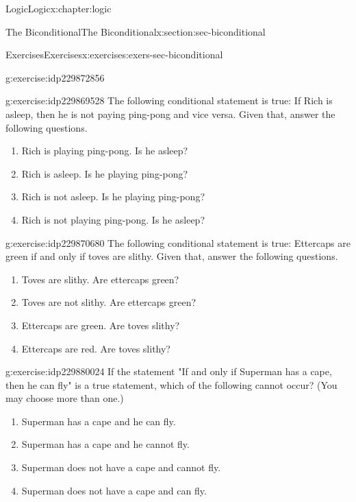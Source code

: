 \documentclass[twoside,10pt,]{book}
\numberwithin{equation}{section}
\begin{document}
\begin{chapterptx}{Logic}{}{Logic}{}{}{x:chapter:logic}
\begin{sectionptx}{The Biconditional}{}{The Biconditional}{}{}{x:section:sec-biconditional}
\begin{exercises-subsection}{Exercises}{}{Exercises}{}{}{x:exercises:exers-sec-biconditional}
\begin{divisionexercise}{33}{}{}{g:exercise:idp229872856}
\end{divisionexercise}%
\begin{divisionexercise}{34}{}{}{g:exercise:idp229869528}%
The following conditional statement is true: If Rich is asleep, then he is not paying ping-pong and vice versa.  Given that, answer the following questions. %
\begin{enumerate}[label=(\alph*)]
\item{}Rich is playing ping-pong.  Is he asleep?%
\item{}Rich is asleep.  Is he playing ping-pong?%
\item{}Rich is not asleep.  Is he playing ping-pong?%
\item{}Rich is not playing ping-pong.  Is he asleep?%
\end{enumerate}
\end{divisionexercise}%
\begin{divisionexercise}{35}{}{}{g:exercise:idp229870680}%
The following conditional statement is true: Ettercaps are green if and only if toves are slithy.  Given that, answer the following questions. %
\begin{enumerate}[label=(\alph*)]
\item{}Toves are slithy.  Are ettercaps green?%
\item{}Toves are not slithy.  Are ettercaps green?%
\item{}Ettercaps are green.  Are toves slithy?%
\item{}Ettercaps are red.  Are toves slithy?%
\end{enumerate}
\end{divisionexercise}%
\begin{divisionexercise}{36}{}{}{g:exercise:idp229880024}%
If the statement "If and only if Superman has a cape, then he can fly" is a true statement, which of the following cannot occur?  (You may choose more than one.) %
\begin{enumerate}[label=(\alph*)]
\item{}Superman has a cape and he can fly.%
\item{}Superman has a cape and he cannot fly.%
\item{}Superman does not have a cape and cannot fly.%
\item{}Superman does not have a cape and can fly.%
\end{enumerate}
\end{divisionexercise}%
\end{exercises-subsection}
%
%
\typeout{************************************************}

\end{sectionptx}
\end{chapterptx}
\end{document}
